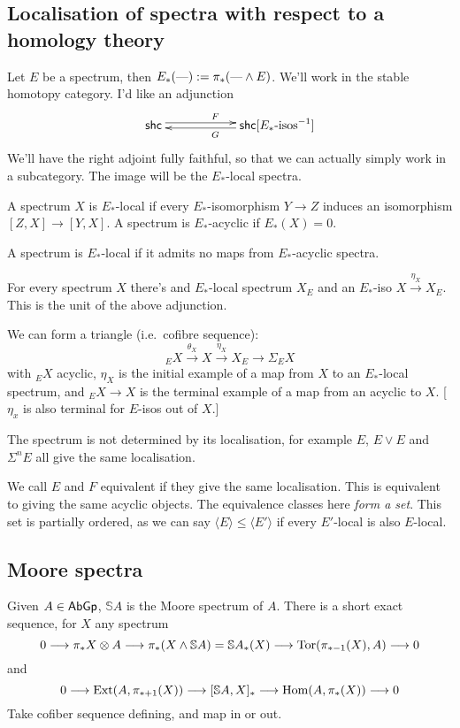 \documentclass[11pt]{article}
\newcommand{\KanSemResponse}[1]
{
\thispagestyle{fancy}
\section{#1}
}
\begin{document}
\begin{MarkusLocalisation}
\KanSemResponse
{Localisation of spectra with respect to a homology theory}
Let $E$ be a spectrum, then $E_*(\textup{---}):=\pi_*(\textup{---}\wedge E)$. We'll work in the stable homotopy category. I'd like an adjunction
\[\xymatrix@R=.3cm@C=2cm{
\mathsf{shc}  \ar@<.6ex>[r]^{F}&
\mathsf{shc}[\textup{$E_*$-isos}^{-1}] \ar@<.4ex>[l]^{G}\\
}\]
We'll have the right adjoint fully faithful, so that we can actually simply work in a subcategory. The image will be the $E_*$-local spectra.
\begin{defn*}
A spectrum $X$ is $E_*$-local if every $E_*$-isomorphism $Y\to Z$ induces an isomorphism $[Z,X]\to[Y,X]$. A spectrum is $E_*$-acyclic if $E_*(X)=0$.
\end{defn*}
\begin{lem*}
A spectrum is $E_*$-local if it admits no maps from $E_*$-acyclic spectra.
\end{lem*}
\begin{thm*}
For every spectrum $X$ there's and $E_*$-local spectrum $X_E$ and an $E_*$-iso $X\overset{\eta_X}{\to} X_E$. This is the unit of the above adjunction.
\end{thm*}
We can form a triangle (i.e.\ cofibre sequence):
\[{_E}X\overset{\theta_X}{\to}X\overset{\eta_X}{\to}X_E\to\Sigma{{_E}X}\]
with ${_E}X$ acyclic, $\eta_X$ is the initial example of a map from $X$ to an $E_*$-local spectrum, and $_EX\to X$ is the terminal example of a map from an acyclic to $X$. [$\eta_x$ is also terminal for $E$-isos out of $X$.]

The spectrum is not determined by its localisation, for example $E$, $E\vee E$ and $\Sigma^nE$ all give the same localisation.
\begin{defn*}
We call $E$ and $F$ equivalent if they give the same localisation. This is equivalent to giving the same acyclic objects. The equivalence classes here \emph{form a set}. This set is partially ordered, as we can say $\langle E\rangle\leq\langle E'\rangle$ if every $E'$-local is also $E$-local.
\end{defn*}
\subsection*{Moore spectra}

\begin{exmp*} Given $A\in\operatorname{{\mathsf{AbGp}}}$, $\mathbb{S}A$ is the Moore spectrum of $A$. There is a short exact sequence, for $X$ any spectrum
\[0\longrightarrow\pi_*X\otimes A\longrightarrow\pi_*(X\wedge\mathbb{S}A) =\mathbb{S}A_*(X)\longrightarrow\operatorname{Tor}(\pi_{*-1}(X),A)\longrightarrow0\]
and
\[0\longrightarrow\operatorname{Ext}(A,\pi_{*+1}(X))\longrightarrow[\mathbb{S}A,X]_*\longrightarrow\operatorname{Hom}(A,\pi_*(X))\longrightarrow0\]
Take cofiber sequence defining, and map in or out.


\end{exmp*}
\end{MarkusLocalisation}
\end{document}
